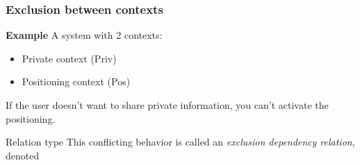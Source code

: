 \begin{frame}[noframenumbering]
	\frametitle{Exclusion between contexts}

	\textbf{Example} A system with 2 contexts:

	\begin{itemize}
		\item Private context (Priv)
		\item Positioning context (Pos)
	\end{itemize}

	If the user doesn't want to share private information, you can't activate
	the positioning.

	\begin{exampleblock}{Relation type}
		This conflicting behavior is called an \emph{exclusion dependency relation},
		denoted 
	\end{exampleblock}
\end{frame}
